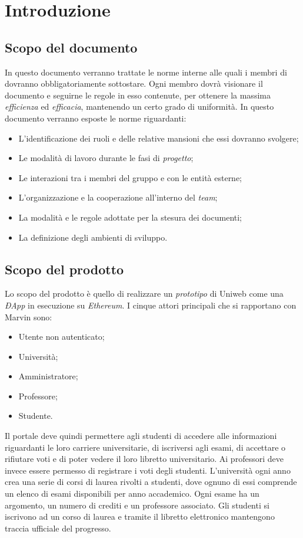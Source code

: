\newpage
\section{Introduzione}

\subsection{Scopo del documento}
In questo documento verranno trattate le norme interne alle quali i membri di \gruppo{} dovranno obbligatoriamente sottostare. Ogni membro dovrà visionare il documento e seguirne le regole in esso contenute, per ottenere la massima \emph{efficienza} ed \emph{efficacia}, mantenendo un certo grado di uniformità.
\newline In questo documento verranno esposte le norme riguardanti:
\begin{itemize}
	\item L'identificazione dei ruoli e delle relative mansioni che essi dovranno svolgere;
	\item Le modalità di lavoro durante le fasi di \emph{progetto};
	\item Le interazioni tra i membri del gruppo e con le entità esterne;
	\item L'organizzazione e la cooperazione all'interno del \emph{team};
	\item La modalità e le regole adottate per la stesura dei documenti;
	\item La definizione degli ambienti di sviluppo.
\end{itemize}
\subsection{Scopo del prodotto}
Lo scopo del prodotto è quello di realizzare un \emph{prototipo} di Uniweb come una \emph{ÐApp} in esecuzione su \emph{Ethereum}. I cinque attori principali che si rapportano con Marvin sono:
\begin{itemize}
	\item Utente non autenticato; 
	\item Università;
	\item Amministratore;
	\item Professore;
	\item Studente.
\end{itemize} 
Il portale deve quindi permettere agli studenti di accedere alle informazioni riguardanti le loro carriere universitarie, di iscriversi agli esami, di accettare o rifiutare voti e di poter vedere il loro libretto universitario.
Ai professori deve invece essere permesso di registrare i voti degli studenti.
L'università ogni anno crea una serie di corsi di laurea rivolti a studenti, dove ognuno di essi comprende un elenco di esami disponibili per anno accademico. Ogni esame ha un argomento, un numero di crediti e un professore associato. Gli studenti si iscrivono ad un corso di laurea e tramite il libretto elettronico mantengono traccia ufficiale del progresso.

